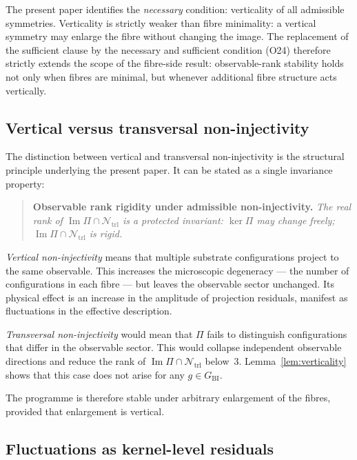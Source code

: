 \documentclass[11pt,a4paper]{article}
\newcommand{\Ntrl}{\mathcal{N}_{\mathrm{trl}}}
\newcommand{\GBI}{G_{\mathrm{BI}}}
\begin{document}
    The present paper identifies the \emph{necessary} condition: verticality of all admissible
    symmetries.
    Verticality is strictly weaker than fibre minimality: a vertical symmetry may enlarge the
    fibre without changing the image.
    The replacement of the sufficient clause by the necessary and sufficient condition
    (O24) therefore strictly extends the scope of the fibre-side result: observable-rank stability
    holds not only when fibres are minimal, but whenever additional fibre structure acts vertically.

  \subsection{Vertical versus transversal non-injectivity}
    \label{sec:vertrans}

    The distinction between vertical and transversal non-injectivity is the structural principle
    underlying the present paper.
    It can be stated as a single invariance property:

    \begin{quote}
      \textbf{Observable rank rigidity under admissible non-injectivity.}
      \emph{The real rank of $\operatorname{Im}\Pi \cap \Ntrl$ is a protected invariant:
        $\ker\Pi$ may change freely; $\operatorname{Im}\Pi \cap \Ntrl$ is rigid.}
    \end{quote}

    \emph{Vertical non-injectivity} means that multiple substrate configurations project to the
    same observable.
    This increases the microscopic degeneracy --- the number of configurations in each fibre ---
    but leaves the observable sector unchanged.
    Its physical effect is an increase in the amplitude of projection residuals, manifest as
    fluctuations in the effective description.

    \emph{Transversal non-injectivity} would mean that $\Pi$ fails to distinguish configurations
    that differ in the observable sector.
    This would collapse independent observable directions and reduce the rank of
    $\operatorname{Im}\Pi \cap \Ntrl$ below~$3$.
    Lemma~\ref{lem:verticality} shows that this case does not arise for any $g \in \GBI$.

    The programme is therefore stable under arbitrary enlargement of the fibres, provided that
    enlargement is vertical.

  \subsection{Fluctuations as kernel-level residuals}
    \label{sec:fluctuations}
\end{document}

